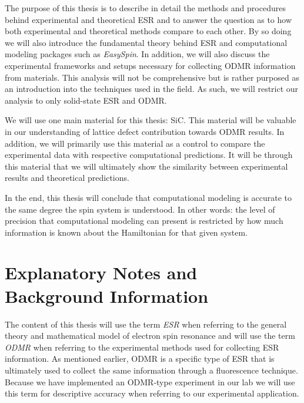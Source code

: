 \documentclass[oneside, noacknowlegments]{BYUPhys}
\begin{document}
The purpose of this thesis is to describe in detail the methods and procedures behind experimental and theoretical ESR and to answer the question as to how both experimental and theoretical methods compare to each other. By so doing we will also introduce the fundamental theory behind ESR and computational modeling packages such as \textit{EasySpin}. In addition, we will also discuss the experimental frameworks and setups necessary for collecting ODMR information from materials. This analysis will not be comprehensive but is rather purposed as an introduction into the techniques used in the field. As such, we will restrict our analysis to only solid-state ESR and ODMR.

We will use one main material for this thesis: SiC. This material will be valuable in our understanding of lattice defect contribution towards ODMR results. In addition, we will primarily use this material as a control to compare the experimental data with respective computational predictions. It will be through this material that we will ultimately show the similarity between experimental results and theoretical predictions.

In the end, this thesis will conclude that computational modeling is accurate to the same degree the spin system is understood. In other words: the level of precision that computational modeling can present is restricted by how much information is known about the Hamiltonian for that given system.

\section{Explanatory Notes and Background Information}

The content of this thesis will use the term \textit{ESR} when referring to the general theory and mathematical model of electron spin resonance and will use the term \textit{ODMR} when referring to the experimental methods used for collecting ESR information. As mentioned earlier, ODMR is a specific type of ESR that is ultimately used to collect the same information through a fluorescence technique. Because we have implemented an ODMR-type experiment in our lab we will use this term for descriptive accuracy when referring to our experimental application.
\end{document}
